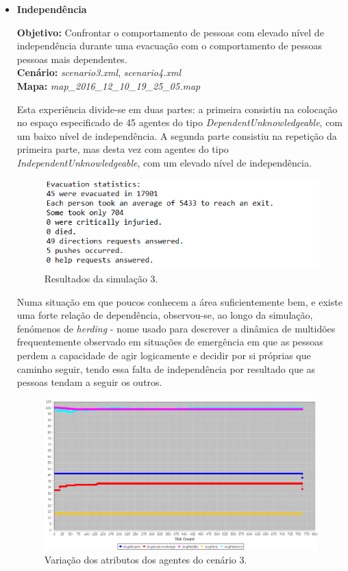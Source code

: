 \documentclass[12pt]{article}
\begin{document}
\begin{titlepage}
\begin{itemize}
\item \textbf{Independência}

\textbf{Objetivo:} 
Confrontar o comportamento de pessoas com elevado nível de independência durante uma evacuação com o comportamento de pessoas pessoas mais dependentes.
\\\textbf{Cenário:} 
\textit{scenario3.xml}, \textit{scenario4.xml}
\\\textbf{Mapa:} 
\textit{map\_2016\_12\_10\_19\_25\_05.map}
\newline


Esta experiência divide-se em duas partes: a primeira consistiu na colocação no espaço especificado de 45 agentes do tipo \textit{DependentUnknowledgeable}, com um baixo nível de independência. A segunda parte consistiu na repetição da primeira parte, mas desta vez com agentes do tipo \textit{IndependentUnknowledgeable}, com um elevado nível de independência.

\begin{figure}[H]
	\centering
	\includegraphics{log_sc_dependent.png}
	\caption{Resultados da simulação 3.}
	\label{log_sc1}
\end{figure}

Numa situação em que poucos conhecem a área suficientemente bem, e existe uma forte relação de dependência, observou-se, ao longo da simulação, fenómenos de \textit{herding} - nome usado para descrever a dinâmica de multidões frequentemente observado em situações de emergência em que as pessoas perdem a capacidade de agir logicamente e decidir por si próprias que caminho seguir, tendo essa falta de independência por resultado que as pessoas tendam a seguir os outros. 

\begin{figure}[H]
	\centering
	\includegraphics{graph_sc_dependent.png}
	\caption{Variação dos atributos dos agentes do cenário 3.}
	\label{graph_sc1}
\end{figure}


\end{itemize}
\end{titlepage}
\end{document}
